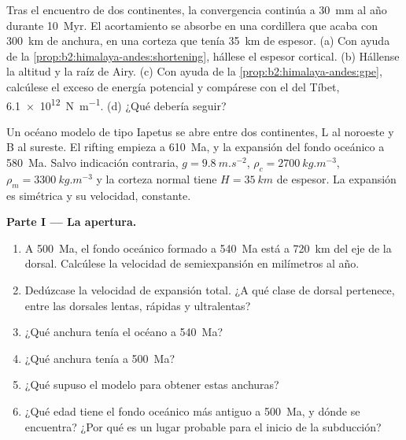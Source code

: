 \begin{exercise}[$\star\star\star$]\label{exo:b2:wilson-cycle:12}
Tras el encuentro de dos continentes, la convergencia continúa a \qty{30}{mm} al año durante \qty{10}{Myr}. El
acortamiento se absorbe en una cordillera que acaba con \qty{300}{km} de anchura, en una corteza que tenía
\qty{35}{km} de espesor. (a) Con ayuda de la \cref{prop:b2:himalaya-andes:shortening}, hállese el espesor
cortical. (b) Hállense la altitud y la raíz de Airy. (c) Con ayuda de la \cref{prop:b2:himalaya-andes:gpe},
calcúlese el exceso de energía potencial y compárese con el del Tíbet, \qty{6.1e12}{N.m^{-1}}.
(d) ¿Qué debería seguir?
\end{exercise}

\begin{problem}\label{pb:b2:wilson-cycle:1}
Un océano modelo de tipo Iapetus se abre entre dos continentes, L al noroeste y B al
sureste. El rifting empieza a \qty{610}{Ma}, y la expansión del fondo oceánico a \qty{580}{Ma}.
Salvo indicación contraria, $g = \qty{9.8}{m.s^{-2}}$, $\rho_c = \qty{2700}{kg.m^{-3}}$, $\rho_m =
\qty{3300}{kg.m^{-3}}$ y la corteza normal tiene $H = \qty{35}{km}$ de espesor. La expansión es
simétrica y su velocidad, constante.

\medskip
\noindent\textbf{Parte I --- La apertura.}
\begin{enumerate}
\item A \qty{500}{Ma}, el fondo oceánico formado a \qty{540}{Ma} está a \qty{720}{km} del eje de la
dorsal. Calcúlese la velocidad de semiexpansión en milímetros al año.
\item Dedúzcase la velocidad de expansión total. ¿A qué clase de dorsal pertenece, entre las dorsales lentas,
rápidas y ultralentas?
\item ¿Qué anchura tenía el océano a \qty{540}{Ma}?
\item ¿Qué anchura tenía a \qty{500}{Ma}?
\item ¿Qué supuso el modelo para obtener estas anchuras?
\item ¿Qué edad tiene el fondo oceánico más antiguo a \qty{500}{Ma}, y dónde se encuentra? ¿Por qué es un
lugar probable para el inicio de la subducción?
\end{enumerate}


\end{problem}
